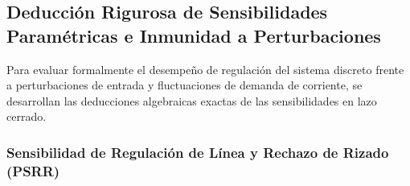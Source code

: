 \subsection{Deducción Rigurosa de Sensibilidades Paramétricas e Inmunidad a Perturbaciones}
\label{subsec:parametric_sensitivities}

Para evaluar formalmente el desempeño de regulación del sistema discreto frente a perturbaciones de entrada y fluctuaciones de demanda de corriente, se desarrollan las deducciones algebraicas exactas de las sensibilidades en lazo cerrado.

\subsubsection{Sensibilidad de Regulación de Línea y Rechazo de Rizado (PSRR)}

